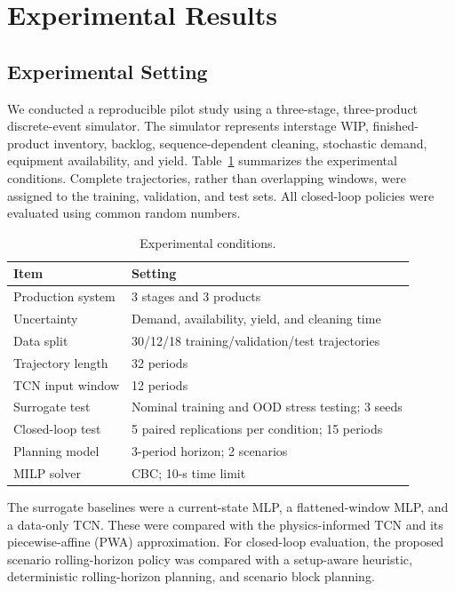 \section{Experimental Results}
\label{sec:experiments}

\subsection{Experimental Setting}

We conducted a reproducible pilot study using a three-stage, three-product discrete-event simulator. The simulator represents interstage WIP, finished-product inventory, backlog, sequence-dependent cleaning, stochastic demand, equipment availability, and yield. Table~\ref{tab:experimental-setting} summarizes the experimental conditions. Complete trajectories, rather than overlapping windows, were assigned to the training, validation, and test sets. All closed-loop policies were evaluated using common random numbers.

\begin{table}[t]
  \centering
  \caption{Experimental conditions.}
  \label{tab:experimental-setting}
  \small
  \begin{tabular}{p{}p{}}
    \hline
    Item & Setting \\
    \hline
    Production system & 3 stages and 3 products \\
    Uncertainty & Demand, availability, yield, and cleaning time \\
    Data split & 30/12/18 training/validation/test trajectories \\
    Trajectory length & 32 periods \\
    TCN input window & 12 periods \\
    Surrogate test & Nominal training and OOD stress testing; 3 seeds \\
    Closed-loop test & 5 paired replications per condition; 15 periods \\
    Planning model & 3-period horizon; 2 scenarios \\
    MILP solver & CBC; 10-s time limit \\
    \hline
  \end{tabular}
\end{table}

The surrogate baselines were a current-state MLP, a flattened-window MLP, and a data-only TCN. These were compared with the physics-informed TCN and its piecewise-affine (PWA) approximation. For closed-loop evaluation, the proposed scenario rolling-horizon policy was compared with a setup-aware heuristic, deterministic rolling-horizon planning, and scenario block planning.

